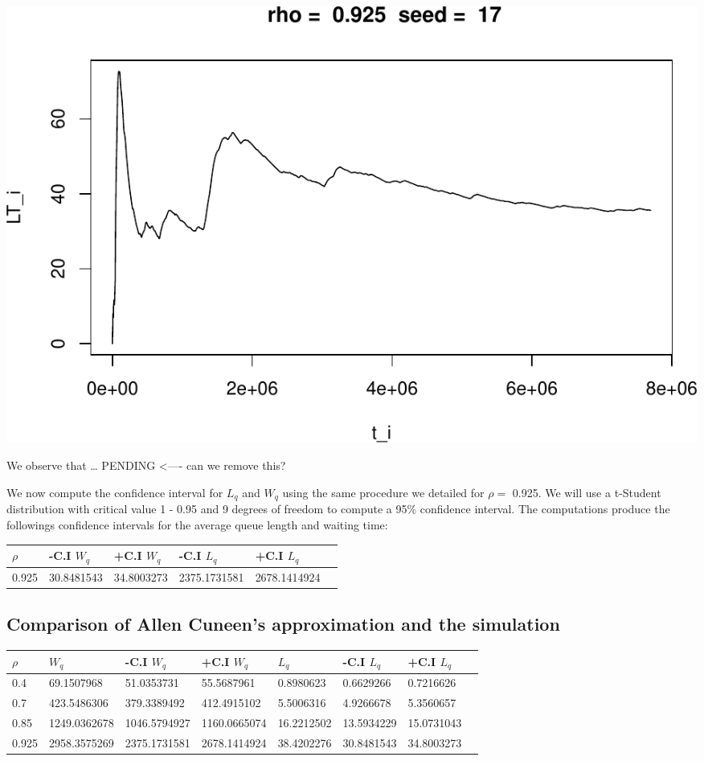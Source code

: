 \documentclass[]{article}
\begin{document}
\includegraphics{003_files/figure-latex/unnamed-chunk-23-10.pdf}

We observe that \ldots{} PENDING \textless{}---- can we remove this?

We now compute the confidence interval for \(L_{q}\) and \(W_{q}\) using
the same procedure we detailed for \(\rho =\) 0.925. We will use a
t-Student distribution with critical value 1 - 0.95 and 9 degrees of
freedom to compute a 95\% confidence interval. The computations produce
the followings confidence intervals for the average queue length and
waiting time:

\begin{longtable}[]{@{}llllll@{}}
\toprule
\(\rho\) & -C.I \(W_{q}\) & +C.I \(W_{q}\) & -C.I \(L_{q}\) & +C.I
\(L_{q}\) &\tabularnewline
\midrule
\endhead
0.925 & 30.8481543 & 34.8003273 & 2375.1731581 &
2678.1414924\tabularnewline
\bottomrule
\end{longtable}

\subsection{Comparison of Allen Cuneen's approximation and the
simulation}\label{comparison-of-allen-cuneens-approximation-and-the-simulation}

\begin{longtable}[]{@{}llllllll@{}}
\toprule
\(\rho\) & \(W_{q}\) & -C.I \(W_{q}\) & +C.I \(W_{q}\) & \(L_{q}\) &
-C.I \(L_{q}\) & +C.I \(L_{q}\) &\tabularnewline
\midrule
\endhead
0.4 & 69.1507968 & 51.0353731 & 55.5687961 & 0.8980623 & 0.6629266 &
0.7216626\tabularnewline
0.7 & 423.5486306 & 379.3389492 & 412.4915102 & 5.5006316 & 4.9266678 &
5.3560657\tabularnewline
0.85 & 1249.0362678 & 1046.5794927 & 1160.0665074 & 16.2212502 &
13.5934229 & 15.0731043\tabularnewline
0.925 & 2958.3575269 & 2375.1731581 & 2678.1414924 & 38.4202276 &
30.8481543 & 34.8003273\tabularnewline
\bottomrule
\end{longtable}
\end{document}

